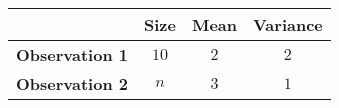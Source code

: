 \begin{tabular}[12pt]{ |c| c| c| c|}
    \hline
    & \textbf{Size} & \textbf{Mean} & \textbf{Variance}\\
    \hline
    \textbf{Observation 1} & $10$ & $2$ & $2$\\
    \hline
    \textbf{Observation 2} & $n$ & $3$ & $1$\\
    \hline
\end{tabular}